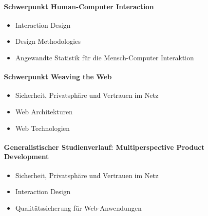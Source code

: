 \paragraph{Schwerpunkt Human-Computer
Interaction\label{/mi-2017/selbstbericht/0150-soll-zustand-geplante-veraenderungen/0000-geplante-veraenderungen-bachelor}}\label{schwerpunkt-human-computer-interactionpathlabelmi-2017selbstbericht0150-soll-zustand-geplante-veraenderungen0000-geplante-veraenderungen-bachelor}

\begin{itemize}
\tightlist
\item
  Interaction Design
\item
  Design Methodologies
\item
  Angewandte Statistik für die Mensch-Computer Interaktion
\end{itemize}

\paragraph{Schwerpunkt Weaving the
Web\label{/mi-2017/selbstbericht/0150-soll-zustand-geplante-veraenderungen/0000-geplante-veraenderungen-bachelor}}\label{schwerpunkt-weaving-the-webpathlabelmi-2017selbstbericht0150-soll-zustand-geplante-veraenderungen0000-geplante-veraenderungen-bachelor}

\begin{itemize}
\tightlist
\item
  Sicherheit, Privatsphäre und Vertrauen im Netz
\item
  Web Architekturen
\item
  Web Technologien
\end{itemize}

\paragraph{Generalistischer Studienverlauf: Multiperspective Product
Development\label{/mi-2017/selbstbericht/0150-soll-zustand-geplante-veraenderungen/0000-geplante-veraenderungen-bachelor}}\label{generalistischer-studienverlauf-multiperspective-product-developmentpathlabelmi-2017selbstbericht0150-soll-zustand-geplante-veraenderungen0000-geplante-veraenderungen-bachelor}

\begin{itemize}
\tightlist
\item
  Sicherheit, Privatsphäre und Vertrauen im Netz
\item
  Interaction Design
\item
  Qualitätssicherung für Web-Anwendungen
\end{itemize}

